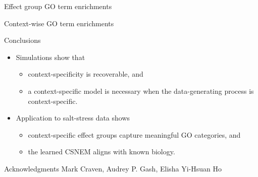 \documentclass[aspectratio=169]{beamer}
\begin{document}
\begin{frame}{Effect group GO term enrichments}
\centering
\end{frame}



\begin{frame}{Context-wise GO term enrichments}
\centering
\end{frame}


\begin{frame}{Conclusions}
 \begin{itemize}
  \item Simulations show that
  \begin{itemize}
   \item context-specificity is recoverable, and
   \item a context-specific model is necessary when the data-generating process is context-specific.
  \end{itemize}
  \item Application to salt-stress data shows
  \begin{itemize}
   \item context-specific effect groups capture meaningful GO categories, and
   \item the learned CSNEM aligns with known biology.
  \end{itemize}
 \end{itemize}
 \pause
 \begin{block}{Acknowledgments}
   Mark Craven, Audrey P. Gash, Elisha Yi-Hsuan Ho %
 \end{block}
\end{frame}

\end{document}
